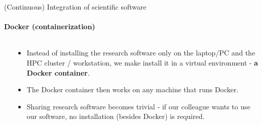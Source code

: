 \begin{frame}{(Continuous) Integration of scientific software} 
    \framesubtitle{Docker (containerization)}
    \vfill

    \begin{columns}
        \begin{column}[c]{0.4\textwidth}
            \begin{center}
            \end{center}
        \end{column}
        \begin{column}[c]{0.6\textwidth}
            \begin{itemize}
                \item Instead of installing the research software only on the laptop/PC and the HPC cluster / workstation, we make install it in a virtual environment - \textbf{a Docker container}.
                \item The Docker container then works on any machine that runs Docker. 
                \item Sharing research software becomes trivial - if our colleague wants to use our software, no installation (besides Docker) is required. 
            \end{itemize}
        \end{column}
    \end{columns}


\end{frame}
